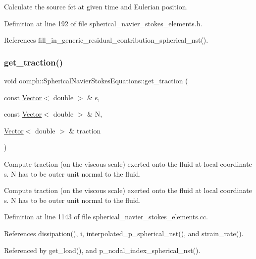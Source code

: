 Calculate the source fct at given time and Eulerian position. 



Definition at line 192 of file spherical\+\_\+navier\+\_\+stokes\+\_\+elements.\+h.



References fill\+\_\+in\+\_\+generic\+\_\+residual\+\_\+contribution\+\_\+spherical\+\_\+nst().

\mbox{\label{classoomph_1_1SphericalNavierStokesEquations_aaf2cd60aa4dc7524aab4cf2ace49805c}} 
\subsubsection{\texorpdfstring{get\+\_\+traction()}{get\_traction()}}
{\footnotesize\ttfamily void oomph\+::\+Spherical\+Navier\+Stokes\+Equations\+::get\+\_\+traction (\begin{DoxyParamCaption}\item[{const \hyperlink{classoomph_1_1Vector}{Vector}$<$ double $>$ \&}]{s,  }\item[{const \hyperlink{classoomph_1_1Vector}{Vector}$<$ double $>$ \&}]{N,  }\item[{\hyperlink{classoomph_1_1Vector}{Vector}$<$ double $>$ \&}]{traction }\end{DoxyParamCaption})}



Compute traction (on the viscous scale) exerted onto the fluid at local coordinate s. N has to be outer unit normal to the fluid. 

Compute traction (on the viscous scale) exerted onto the fluid at local coordinate s. N has to be outer unit normal to the fluid. 

Definition at line 1143 of file spherical\+\_\+navier\+\_\+stokes\+\_\+elements.\+cc.



References dissipation(), i, interpolated\+\_\+p\+\_\+spherical\+\_\+nst(), and strain\+\_\+rate().



Referenced by get\+\_\+load(), and p\+\_\+nodal\+\_\+index\+\_\+spherical\+\_\+nst().


